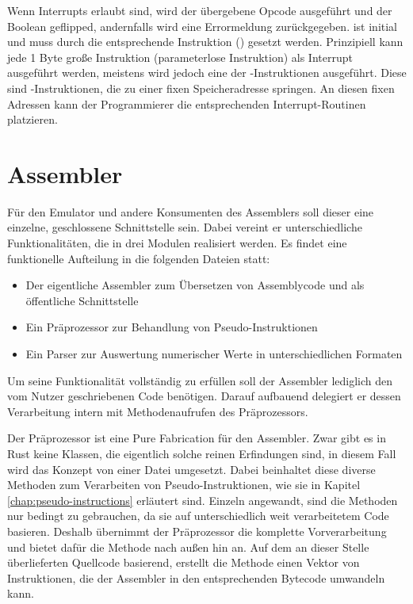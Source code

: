 Wenn Interrupts erlaubt sind, wird der übergebene Opcode ausgeführt und der Boolean geflipped, andernfalls wird eine Errormeldung zurückgegeben.  ist initial  und muss durch die entsprechende Instruktion () gesetzt werden.
Prinzipiell kann jede 1 Byte große Instruktion (parameterlose Instruktion) als Interrupt ausgeführt werden, meistens wird jedoch eine der -Instruktionen ausgeführt. Diese sind -Instruktionen, die zu einer fixen Speicheradresse springen. An diesen fixen Adressen kann der Programmierer die entsprechenden Interrupt-Routinen platzieren.

\section{Assembler}

Für den Emulator und andere Konsumenten des Assemblers soll dieser eine einzelne, geschlossene Schnittstelle sein. Dabei vereint er unterschiedliche Funktionalitäten, die in drei Modulen realisiert werden. Es findet eine funktionelle Aufteilung in die folgenden Dateien statt:

\begin{itemize}
	\item Der eigentliche Assembler zum Übersetzen von Assemblycode und als öffentliche Schnittstelle
	\item Ein Präprozessor zur Behandlung von Pseudo-Instruktionen
	\item Ein Parser zur Auswertung numerischer Werte in unterschiedlichen Formaten
\end{itemize}

Um seine Funktionalität vollständig zu erfüllen soll der Assembler lediglich den vom Nutzer geschriebenen Code benötigen. Darauf aufbauend delegiert er dessen Verarbeitung intern mit Methodenaufrufen des Präprozessors.

Der Präprozessor ist eine \glqq Pure Fabrication\grqq{} für den Assembler. Zwar gibt es in Rust keine Klassen, die eigentlich solche reinen Erfindungen sind, in diesem Fall wird das Konzept von einer Datei umgesetzt. Dabei beinhaltet diese diverse Methoden zum Verarbeiten von Pseudo-Instruktionen, wie sie in Kapitel \ref{chap:pseudo-instructions} erläutert sind. Einzeln angewandt, sind die Methoden nur bedingt zu gebrauchen, da sie auf unterschiedlich weit verarbeitetem Code basieren. Deshalb übernimmt der Präprozessor die komplette Vorverarbeitung und bietet dafür die Methode  nach außen hin an. Auf dem an dieser Stelle überlieferten Quellcode basierend, erstellt die Methode einen Vektor von Instruktionen, die der Assembler in den entsprechenden Bytecode umwandeln kann.

